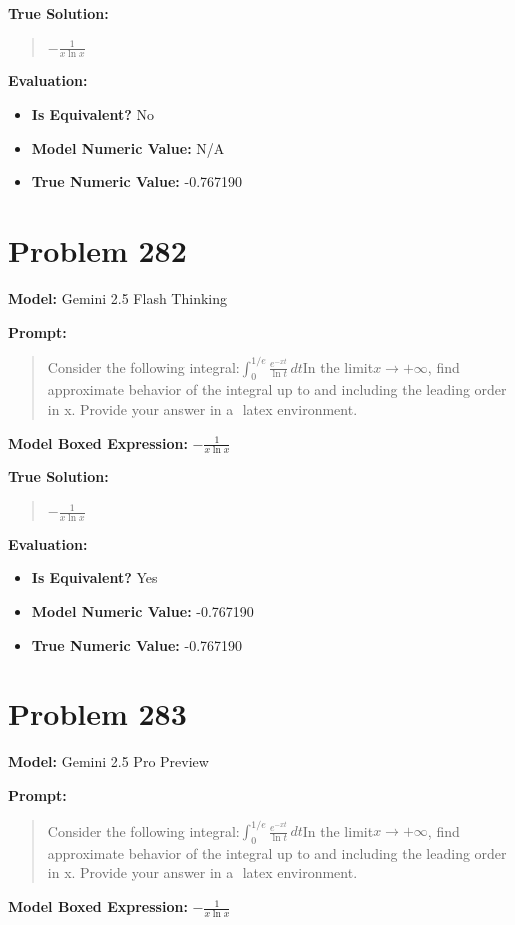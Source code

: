 \documentclass{article}
\begin{document}
{\textbf{True Solution:}
\begin{quote}
$-\frac{1}{x \ln x}$
\end{quote}

\textbf{Evaluation:}
\begin{itemize}
\item \textbf{Is Equivalent?} No
\item \textbf{Model Numeric Value:} N/A
\item \textbf{True Numeric Value:} -0.767190
\end{itemize}
\vspace{1cm}
\section*{Problem 282}
\textbf{Model:} Gemini 2.5 Flash Thinking

\textbf{Prompt:}
\begin{quote}
Consider the following integral:$\int_{0}^{1/e} \frac{e^{-xt}}{\ln t} \, dt$In the limit$x \to +\infty$, find approximate behavior of the integral up to and including the leading order in x. Provide your answer in a $\boxed{}$ latex environment.
\end{quote}
\textbf{Model Boxed Expression:} $-\frac{1}{x \ln x}$

\textbf{True Solution:}
\begin{quote}
$-\frac{1}{x \ln x}$
\end{quote}

\textbf{Evaluation:}
\begin{itemize}
\item \textbf{Is Equivalent?} Yes
\item \textbf{Model Numeric Value:} -0.767190
\item \textbf{True Numeric Value:} -0.767190
\end{itemize}
\vspace{1cm}
\section*{Problem 283}
\textbf{Model:} Gemini 2.5 Pro Preview

\textbf{Prompt:}
\begin{quote}
Consider the following integral:$\int_{0}^{1/e} \frac{e^{-xt}}{\ln t} \, dt$In the limit$x \to +\infty$, find approximate behavior of the integral up to and including the leading order in x. Provide your answer in a $\boxed{}$ latex environment.
\end{quote}
\textbf{Model Boxed Expression:} $-\frac{1}{x \ln x}$

}
\end{document}
